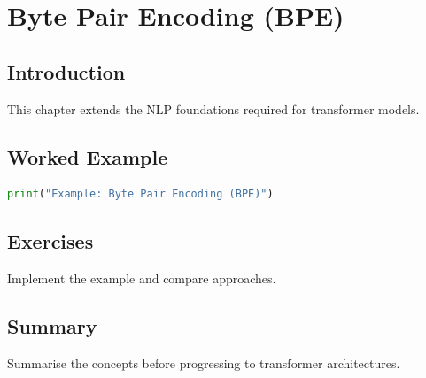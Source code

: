 \chapter{Byte Pair Encoding (BPE)}
\label{chap:vol8-7}



\section{Introduction}
This chapter extends the NLP foundations required for transformer models.

\section{Worked Example}
\begin{lstlisting}[language=Python]
print("Example: Byte Pair Encoding (BPE)")
\end{lstlisting}

\section{Exercises}
\begin{exercise}
Implement the example and compare approaches.
\end{exercise}

\section{Summary}
Summarise the concepts before progressing to transformer architectures.

